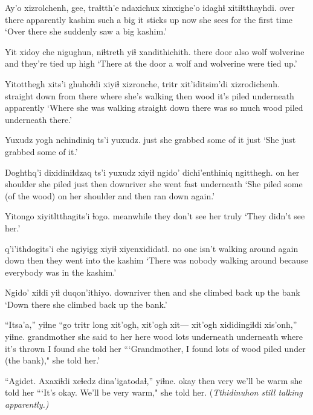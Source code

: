 \documentclass[12pt]{article}
\begin{document}
\gll Ay'o       xizrolchenh, gee, traɬtth'e ndaxichux xinxighe'o    idaghɬ xitiɬtthayhdi.
{{over there} } apparently  {}  kashim    {such a big}    {it sticks up} now    {she sees for the first time}
\glt `Over there she suddenly saw a big kashim.'
\glend

\gll Yit   xidoy che  nigughun, niɬtreth  yiɬ xandithichith. 
there door  also wolf      wolverine and {they're tied up high}
\glt `There at the door a wolf and wolverine were tied up.'
\glend

\gll Yitotthegh    xits'i ghuhoɬdi  xiyiɬ xizronche, tritr xit'iditsim'di xizrodichenh.
{straight down} {from there} {where she's walking} then {}  wood  {it's piled underneath} apparently
\glt `Where she was walking straight down there was so much wood piled underneath there.'
\glend

\gll Yuxudz {yogh nchindiniq} ts'i yuxudz.
just   {she grabbed some of it} {} just
\glt `She just grabbed some of it.'  
\glend

\gll Doghthq'i     dixidiniɬdzaq ts'i yuxudz xiyiɬ ngido' dichi'enthiniq ngitthegh.
{on her shoulder} {she piled}  {}   just   then  downriver  {she went fast}     underneath
\glt `She piled some (of the wood) on her shoulder and then ran down again.'
\glend

\gll Yitongo   {xiyitltthagits'i} ɬogo.
meanwhile {they don't see her } truly
\glt `They didn't see her.'
\glend

 {q'i'ithdogits'i}   che ngiyigg xiyiɬ xiyenxididatl.
{no one}    {isn't walking around} again   down    then   {they went into the kashim}
\glt `There was nobody walking around because everybody was in the kashim.'
\glend

\gll Ngido' xiɬdi yiɬ duqon'ithiyo.
downriver then  and {she climbed back up the bank}
\glt `Down there she climbed back up the bank.'
\glend

\gll ``Itsa'a,''       yiɬne ``go  tritr long xit'ogh, {xit'ogh xit---} xit'ogh {xididingiɬdi} xis'onh,'' yiɬne.
grandmother {she said to her} here wood lots {underneath} {} underneath {where it's thrown}  {I found}  {she told her}
\glt ```Grandmother, I found lots of wood piled under (the bank)," she told her.'
\glend

\gll ``Agidet. Axaxiɬdi xeɬedz dina'igatodaɬ,''  yiɬne.
okay    then      very   {we'll be warm}  {she told her}
\glt ```It's okay. We'll be very warm," she told her. (\em Tthidinuhon \em still talking apparently.)
\glend
\end{document}
